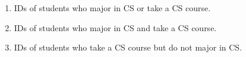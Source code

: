 \documentclass[11pt]{article}
\newcommand{\anspace}[1]{\par\vspace{#1}}
\begin{document}
\begin{enumerate}[label=\alph*.]
  \item IDs of students who major in CS or take a CS course. \hfill 
  \anspace{0.5in}
  \item IDs of students who major in CS and take a CS course. \hfill
  \anspace{0.5in}
  \item IDs of students who take a CS course but do not major in CS. \hfill 
  \anspace{0.5in}
\end{enumerate}
\end{document}
